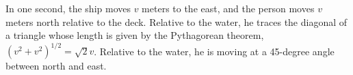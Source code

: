 In one second, the ship moves $v$ meters to the east,
and the person moves $v$ meters north relative to the deck.
Relative to the water, he traces the diagonal of a triangle
whose length is given by the Pythagorean theorem, 
$(v^2+v^2)^{1/2}=\sqrt{2}v$. Relative to the water, he is moving at
a 45-degree angle between north and east.



